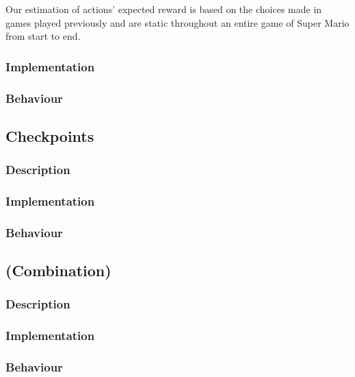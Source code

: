 \documentclass[10pt,a4paper]{article}
\begin{document}
Our estimation of actions' expected reward is based on the choices made in games played previously and are static throughout an entire game of Super Mario from start to end.

\subsubsection{Implementation}


\subsubsection{Behaviour}
\subsection{Checkpoints}
\subsubsection{Description}
\subsubsection{Implementation}
\subsubsection{Behaviour}
\subsection{(Combination)}
\subsubsection{Description}
\subsubsection{Implementation}
\subsubsection{Behaviour}

\clearpage
\end{document}
